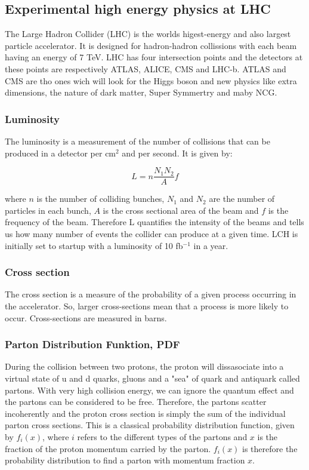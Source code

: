 \subsection{Experimental high energy physics at LHC}
The Large Hadron Collider (LHC) is the worlds higest-energy and also largest particle accelerator. It is designed for hadron-hadron collissions with each beam having an energy of 7 TeV. LHC has four intersection points and the detectors at these points are respectively ATLAS, ALICE, CMS and LHC-b. ATLAS and CMS are tho ones wich will look for the Higgs boson and new physics like extra dimensions, the nature of dark matter, Super Symmertry and maby NCG. 

\subsubsection{Luminosity}
The luminosity is a measurement of the number of collisions that can be produced in a detector per cm$^{2}$ and per second. It is given by:

\begin{equation}
L=n\frac{N_{1}N_{2}}{A}f
\end{equation}

where $n$ is the number of colliding bunches, $N_{1}$ and $N_{2}$ are the number of particles in each bunch, $A$ is the cross sectional area of the beam and $f$ is the frequency of the beam. Therefore L quantifies the intensity of the beams and tells us how many number of events the collider can produce at a given time. LCH is initially set to startup with a luminosity of 10 fb$^{-1}$ in a year.

\subsubsection{Cross section}
The cross section is a measure of the probability of a given process occurring in the accelerator. So, larger cross-sections mean that a process is more likely to occur. Cross-sections are measured in barns.

\subsubsection{Parton Distribution Funktion, PDF}
During the collision between two protons, the proton will dissasociate into a virtual state of u and d quarks, gluons and a "sea" of quark and antiquark called partons. With very high collision energy, we can ignore the quantum effect and the partons can be considered to be free. Therefore, the partons scatter incoherently and the proton cross section is simply the sum of the individual parton cross sections. This is a classical probability distribution function, given by $f_{i}(x)$, where $i$ refers to the different types of the partons and $x$ is the fraction of the proton momentum carried by the parton\cite{green2005hpp}. $f_{i}(x)$ is therefore the probability distribution to find a parton with momentum fraction $x$.

